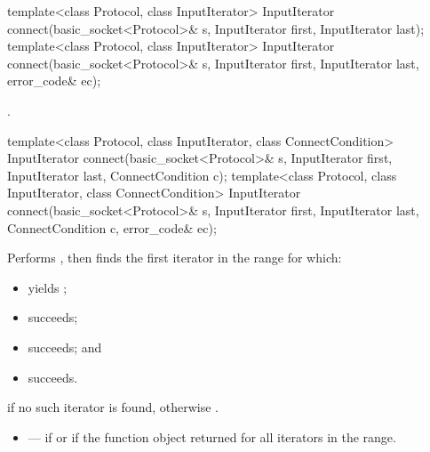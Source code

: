 \begin{itemdecl}
template<class Protocol, class InputIterator>
  InputIterator connect(basic_socket<Protocol>& s,
                        InputIterator first, InputIterator last);
template<class Protocol, class InputIterator>
  InputIterator connect(basic_socket<Protocol>& s,
                        InputIterator first, InputIterator last,
                        error_code& ec);
\end{itemdecl}

\begin{itemdescr}
\pnum
\returns {}.
\end{itemdescr}

\begin{itemdecl}
template<class Protocol, class InputIterator, class ConnectCondition>
  InputIterator connect(basic_socket<Protocol>& s,
                        InputIterator first, InputIterator last,
                        ConnectCondition c);
template<class Protocol, class InputIterator, class ConnectCondition>
  InputIterator connect(basic_socket<Protocol>& s,
                        InputIterator first, InputIterator last,
                        ConnectCondition c, error_code& ec);
\end{itemdecl}

\begin{itemdescr}
\pnum
\effects Performs , then finds the first iterator  in the range  for which:
\begin{itemize}
\item
{} yields ;
\item
{} succeeds;
\item
{} succeeds; and
\item
{} succeeds.
\end{itemize}

\pnum
\returns {} if no such iterator is found, otherwise .

\pnum
\errors
\begin{itemize}
\item
{} --- if  or if the function object  returned  for all iterators in the range.
\end{itemize}
\end{itemdescr}



